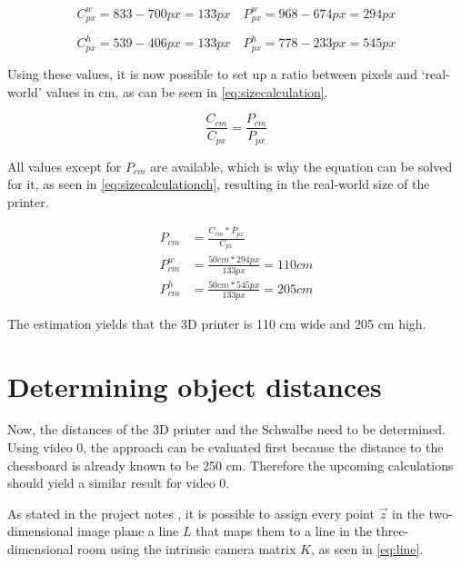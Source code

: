 \begin{equation} \label{eq:widths}
    C_{px}^w = 833 - 700 px = 133 px \quad
    P_{px}^w = 968 - 674 px = 294 px
\end{equation}

\begin{equation} \label{eq:heights}
    C_{px}^h = 539 - 406 px = 133 px \quad
    P_{px}^h = 778 - 233 px = 545 px
\end{equation}

Using these values, it is now possible to set up a ratio between pixels and \enquote*{real-world} values in cm, as can be seen in \autoref{eq:sizecalculation}.

\begin{equation} \label{eq:sizecalculation}
    \frac{C_{cm}}{C_{px}} = \frac{P_{cm}}{P_{px}}
\end{equation}

All values except for $P_{cm}$ are available, which is why the equation can be solved for it, as seen in \autoref{eq:sizecalculationch}, resulting in the real-world size of the printer.

\begin{equation} \label{eq:sizecalculationch}
    \begin{split}
        P_{cm} & = \frac{C_{cm} * P_{px}}{C_{px}}\\
        P_{cm}^w & = \frac{50 cm * 294 px}{133 px} = 110 cm\\
        P_{cm}^h & = \frac{50 cm * 545 px}{133 px} = 205 cm
    \end{split}
\end{equation}

The estimation yields that the 3D printer is 110 cm wide and 205 cm high.

\section{Determining object distances}

Now, the distances of the 3D printer and the Schwalbe need to be determined. Using video 0, the approach can be evaluated first because the distance to the chessboard is already known to be 250 cm. Therefore the upcoming calculations should yield a similar result for video 0.

As stated in the project notes \cite{cv_lecture_ex}, it is possible to assign every point $\vec{z}$ in the two-dimensional image plane a line $L$ that maps them to a line in the three-dimensional room using the intrinsic camera matrix $K$, as seen in \autoref{eq:line}.

